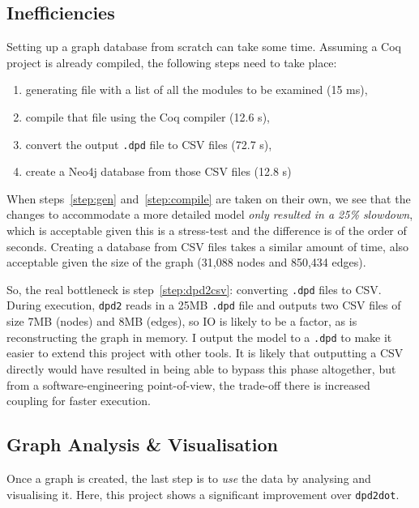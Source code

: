 \subsection{Inefficiencies}\label{subsec:ineff}

Setting up a graph database from scratch can take some time. Assuming a Coq
project is already compiled, the following steps need to take place:

\begin{enumerate}
  \item\label{step:gen} generating file with a list of all the modules to be
    examined (15 ms),
  \item\label{step:compile} compile that file using the Coq compiler (12.6 s),
  \item\label{step:dpd2csv} convert the output \texttt{.dpd} file to CSV files (72.7 s),
  \item create a Neo4j database from those CSV files (12.8 s)
\end{enumerate}

When steps~\ref{step:gen} and~\ref{step:compile} are taken on their own, we see
that the changes to accommodate a more detailed model \emph{only resulted in a
25\% slowdown}, which is acceptable given this is a stress-test and the
difference is of the order of seconds. Creating a database from CSV files takes
a similar amount of time, also acceptable given the size of the graph (31,088
nodes and 850,434 edges).

So, the real bottleneck is step~\ref{step:dpd2csv}: converting \texttt{.dpd}
files to CSV. During execution, \texttt{dpd2} reads in a 25MB \texttt{.dpd} file
and outputs two CSV files of size 7MB (nodes) and 8MB (edges), so IO is likely
to be a factor, as is reconstructing the graph in memory. I output the model to
a \texttt{.dpd} to make it easier to extend this project with other tools. It is
likely that outputting a CSV directly would have resulted in being able to
bypass this phase altogether, but from a software-engineering point-of-view, the
trade-off there is increased coupling for faster execution.

\subsection{Graph Analysis \& Visualisation}

Once a graph is created, the last step is to \emph{use} the data by analysing
and visualising it. Here, this project shows a significant improvement over
\texttt{dpd2dot}.

